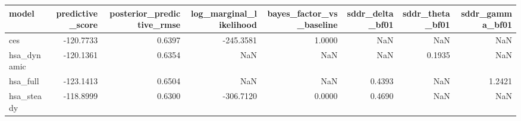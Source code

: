 \begin{tabular}{lrrrrrrr}
\toprule
model & predictive\_score & posterior\_predictive\_rmse & log\_marginal\_likelihood & bayes\_factor\_vs\_baseline & sddr\_delta\_bf01 & sddr\_theta\_bf01 & sddr\_gamma\_bf01 \\
\midrule
ces & -120.7733 & 0.6397 & -245.3581 & 1.0000 & NaN & NaN & NaN \\
hsa\_dynamic & -120.1361 & 0.6354 & NaN & NaN & NaN & 0.1935 & NaN \\
hsa\_full & -123.1413 & 0.6504 & NaN & NaN & 0.4393 & NaN & 1.2421 \\
hsa\_steady & -118.8999 & 0.6300 & -306.7120 & 0.0000 & 0.4690 & NaN & NaN \\
\bottomrule
\end{tabular}
